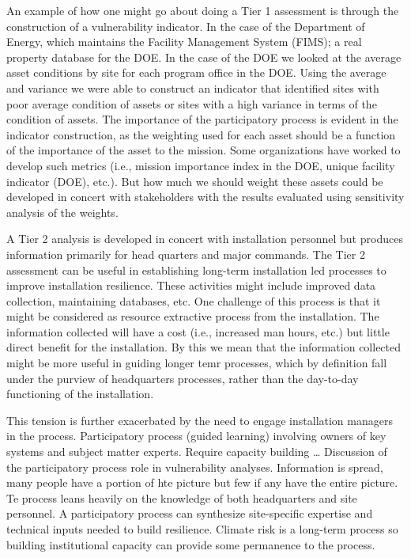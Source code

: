 \documentclass[10pt]{amsart}
\begin{document}
An example of how one might go about doing a Tier 1 assessment is through the construction of a vulnerability indicator.
In the case of the Department of Energy, which maintains the Facility Management System (FIMS); a real property database for the DOE.
In the case of the DOE we looked at the average asset conditions by site for each program office in the DOE. 
Using the average and variance we were able to construct an indicator that identified sites with poor average condition of assets or sites with a high variance in terms of the condition of assets.
The importance of the participatory process is evident in the indicator construction, as the weighting used for each asset should be a function of the importance of the asset to the mission.
Some organizations have worked to develop such metrics (i.e., mission importance index in the DOE, unique facility indicator (DOE), etc.).
But how much we should weight these assets could be developed in concert with stakeholders with the results evaluated using sensitivity analysis of the weights.

A Tier 2 analysis is developed in concert with installation personnel but produces information primarily for head quarters and major commands.
The Tier 2 assessment can be useful in establishing long-term installation led processes to improve installation resilience.
These activities might include improved data collection, maintaining databases, etc.
One challenge of this process is that it might be considered as resource extractive process from the installation.
The information collected will have a cost (i.e., increased man hours, etc.) but little direct benefit for the installation.
By this we mean that the information collected might be more useful in guiding longer temr processes, which by definition fall under the purview of headquarters processes, rather than the day-to-day functioning of the installation. 

This tension is further exacerbated by the need to engage installation managers in the process.
Participatory process (guided learning) involving owners of key systems and subject matter experts.
Require capacity building \ldots
Discussion of the participatory process role in vulnerability analyses.
Information is spread, many people have a portion of hte picture but few if any have the entire picture.
Te process leans heavily on the knowledge of both headquarters and site personnel. 
A participatory process can synthesize site-specific expertise and technical inputs needed to build resilience. 
Climate risk is a long-term process so building institutional capacity can provide some permanence to the process.
\end{document}
